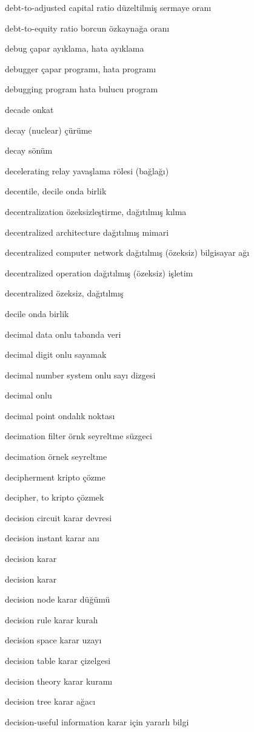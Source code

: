 \documentclass[12pt,fleqn]{article}\usepackage{../../common}
\begin{document}
debt-to-adjusted capital ratio düzeltilmiş sermaye oranı

debt-to-equity ratio borcun özkaynağa oranı

debug çapar ayıklama, hata ayıklama

debugger çapar programı, hata programı

debugging program hata bulucu program

decade onkat

decay (nuclear) çürüme

decay sönüm

decelerating relay yavaşlama rölesi (bağlağı)

decentile, decile onda birlik

decentralization özeksizleştirme, dağıtılmış kılma

decentralized architecture dağıtılmış mimari

decentralized computer network dağıtılmış (özeksiz) bilgisayar ağı

decentralized operation dağıtılmış (özeksiz) işletim

decentralized özeksiz, dağıtılmış

decile onda birlik

decimal data onlu tabanda veri

decimal digit onlu sayamak

decimal number system onlu sayı dizgesi

decimal onlu

decimal point ondalık noktası

decimation filter örnk seyreltme süzgeci

decimation örnek seyreltme

decipherment kripto çözme

decipher, to kripto çözmek

decision circuit karar devresi

decision instant karar anı

decision karar

decision karar

decision node karar düğümü

decision rule karar kuralı

decision space karar uzayı

decision table karar çizelgesi

decision theory karar kuramı

decision tree karar ağacı

decision-useful information karar için yararlı bilgi
\end{document}
